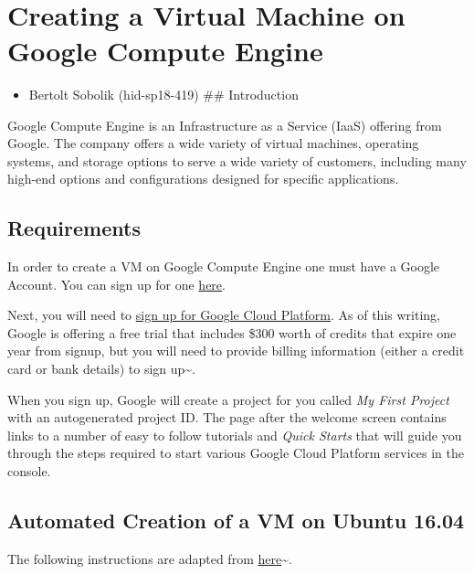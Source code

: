 \MDNAME\

\section{Creating a Virtual Machine on Google Compute Engine}

\begin{itemize}
\item
  Bertolt Sobolik (hid-sp18-419) \#\# Introduction
\end{itemize}

Google Compute Engine is an Infrastructure as a Service (IaaS) offering
from Google. The company offers a wide variety of virtual machines,
operating systems, and storage options to serve a wide variety of
customers, including many high-end options and configurations designed
for specific applications.

\subsection{Requirements}

In order to create a VM on Google Compute Engine one must have a Google
Account. You can sign up for one
\href{https://accounts.google.com/SignUp?hl=en}{here}.

Next, you will need to
\href{https://console.cloud.google.com/freetrial}{sign up for Google
Cloud Platform}. As of this writing, Google is offering a free trial
that includes \$300 worth of credits that expire one year from signup,
but you will need to provide billing information (either a credit card
or bank details) to sign
up\textasciitilde{}\cite{hid-sp18-419-tutorial-gce-signup}.

When you sign up, Google will create a project for you called \emph{My
First Project} with an autogenerated project ID. The page after the
welcome screen contains links to a number of easy to follow tutorials
and \emph{Quick Starts} that will guide you through the steps required
to start various Google Cloud Platform services in the console.

\subsection{Automated Creation of a VM on Ubuntu 16.04}

The following instructions are adapted from
\href{https://cloud.google.com/sdk/docs/quickstart-debian-ubuntu?authuser=1}{here}\textasciitilde{}\cite{hid-sp18-419-tutorial-gce-setup}.

